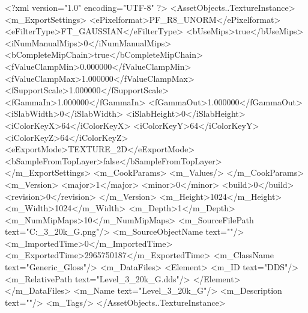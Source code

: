 <?xml version="1.0" encoding="UTF-8" ?>
<AssetObjects..TextureInstance>
	<m_ExportSettings>
		<ePixelformat>PF_R8_UNORM</ePixelformat>
		<eFilterType>FT_GAUSSIAN</eFilterType>
		<bUseMips>true</bUseMips>
		<iNumManualMips>0</iNumManualMips>
		<bCompleteMipChain>true</bCompleteMipChain>
		<fValueClampMin>0.000000</fValueClampMin>
		<fValueClampMax>1.000000</fValueClampMax>
		<fSupportScale>1.000000</fSupportScale>
		<fGammaIn>1.000000</fGammaIn>
		<fGammaOut>1.000000</fGammaOut>
		<iSlabWidth>0</iSlabWidth>
		<iSlabHeight>0</iSlabHeight>
		<iColorKeyX>64</iColorKeyX>
		<iColorKeyY>64</iColorKeyY>
		<iColorKeyZ>64</iColorKeyZ>
		<eExportMode>TEXTURE_2D</eExportMode>
		<bSampleFromTopLayer>false</bSampleFromTopLayer>
	</m_ExportSettings>
	<m_CookParams>
		<m_Values/>
	</m_CookParams>
	<m_Version>
		<major>1</major>
		<minor>0</minor>
		<build>0</build>
		<revision>0</revision>
	</m_Version>
	<m_Height>1024</m_Height>
	<m_Width>1024</m_Width>
	<m_Depth>1</m_Depth>
	<m_NumMipMaps>10</m_NumMipMaps>
	<m_SourceFilePath text="C:\Users\Shadow\Desktop\Prototypes\Level_3_20k_G.png"/>
	<m_SourceObjectName text=""/>
	<m_ImportedTime>0</m_ImportedTime>
	<m_ExportedTime>2965750187</m_ExportedTime>
	<m_ClassName text="Generic_Gloss"/>
	<m_DataFiles>
		<Element>
			<m_ID text="DDS"/>
			<m_RelativePath text="Level_3_20k_G.dds"/>
		</Element>
	</m_DataFiles>
	<m_Name text="Level_3_20k_G"/>
	<m_Description text=""/>
	<m_Tags/>
</AssetObjects..TextureInstance>

